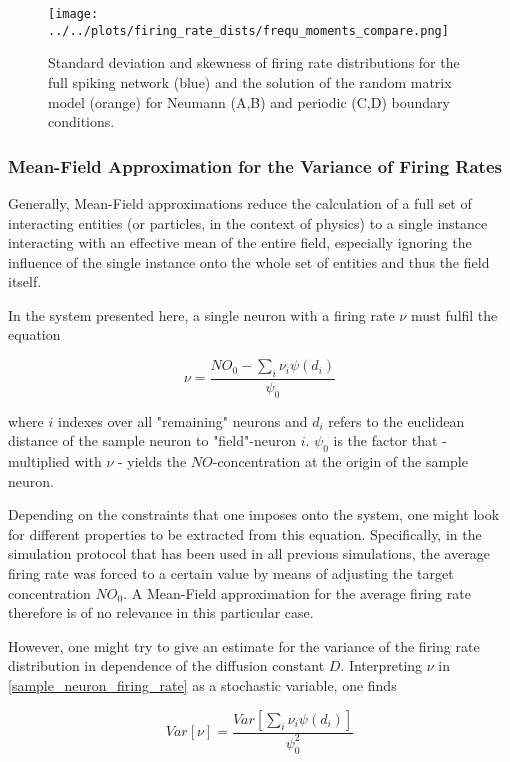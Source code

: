\documentclass[10pt,a4paper]{article}
\begin{document}
\begin{figure}
\texttt{[image: ../../plots/firing\_rate\_dists/frequ\_moments\_compare.png]}
\caption{Standard deviation and skewness of firing rate distributions for the full spiking network (blue) and the solution of the random matrix model (orange) for Neumann (A,B) and periodic (C,D) boundary conditions.}
\label{frequ_moments_compare}
\end{figure}

\subsubsection{Mean-Field Approximation for the Variance of Firing Rates}

Generally, Mean-Field approximations reduce the calculation of a full set of interacting entities (or particles, in the context of physics) to a single instance interacting with an effective mean of the entire field, especially ignoring the influence of the single instance onto the whole set of entities and thus the field itself.

In the system presented here, a single neuron with a firing rate $\nu$ must fulfil the equation

\begin{equation}
\nu =\frac{NO_0 - \sum \limits_{i} \nu_i \psi(d_i)}{\psi_0}
\label{sample_neuron_firing_rate}
\end{equation}

where $i$ indexes over all "remaining" neurons and $d_i$ refers to the euclidean distance of the sample neuron to "field"-neuron $i$. $\psi_0$ is the factor that - multiplied with $\nu$ - yields the $NO$-concentration at the origin of the sample neuron.

Depending on the constraints that one imposes onto the system, one might look for different properties to be extracted from this equation. Specifically, in the simulation protocol that has been used in all previous simulations, the average firing rate was forced to a certain value by means of adjusting the target concentration $NO_0$. A Mean-Field approximation for the average firing rate therefore is of no relevance in this particular case.

However, one might try to give an estimate for the variance of the firing rate distribution in dependence of the diffusion constant $D$. Interpreting $\nu$ in \eqref{sample_neuron_firing_rate} as a stochastic variable, one finds

\begin{equation}
Var[\nu] = \frac{Var[\sum \limits_{i} \nu_i \psi(d_i)]}{\psi_0^2}
\label{variance_sample_neuron_firing_rate}
\end{equation}
\end{document}
